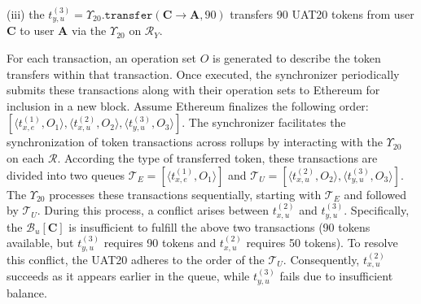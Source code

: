 (iii) the $t^{(3)}_{y,u} = \Upsilon_{20}.\mathtt{transfer}(\mathbf{C}\rightarrow \mathbf{A},90)$ transfers 90 UAT20 tokens from user \textbf{C} to user \textbf{A} via the $\Upsilon_{20}$ on $\mathcal{R}_Y$.

For each transaction, an operation set $O$ is generated to describe the token transfers within that transaction. Once executed, the synchronizer periodically submits these transactions along with their operation sets to Ethereum for inclusion in a new block. Assume Ethereum finalizes the following order: $[\langle t^{(1)}_{x,e}, O_1 \rangle, \langle t^{(2)}_{x,u}, O_2 \rangle, \langle t^{(3)}_{y,u}, O_3 \rangle]$.
The synchronizer facilitates the synchronization of token transactions across rollups by interacting with the $\Upsilon_{20}$ on each $\mathcal{R}$. According the type of transferred token, these transactions are divided into two queues $\mathcal{T}_E = [\langle t^{(1)}_{x,e}, O_1 \rangle]$ and $\mathcal{T}_U = [\langle t^{(2)}_{x,u}, O_2 \rangle, \langle t^{(3)}_{y,u}, O_3 \rangle]$.
The $\Upsilon_{20}$ processes these transactions sequentially, starting with $\mathcal{T}_E$ and followed by $\mathcal{T}_U$. During this process, a conflict arises between $t^{(2)}_{x,u}$ and $t^{(3)}_{y,u}$. Specifically, the $\mathcal{B}_u[\mathbf{C}]$ is insufficient to fulfill the above two transactions (90 tokens available, but $t^{(3)}_{y,u}$ requires 90 tokens and $t^{(2)}_{x,u}$ requires 50 tokens). To resolve this conflict, the UAT20 adheres to the order of the $\mathcal{T}_U$. Consequently, $t^{(2)}_{x,u}$ succeeds as it appears earlier in the queue, while $t^{(3)}_{y,u}$ fails due to insufficient balance.









